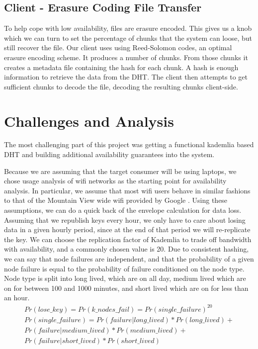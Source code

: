 \documentclass[a4paper,10pt]{article}
\begin{document}
\subsection{Client - Erasure Coding File Transfer}
To help cope with low availability, files are erasure encoded. This gives us a 
knob which we can turn to set the percentage of chunks that the system can 
loose, but still recover the file. Our client uses using Reed-Solomon codes, an 
optimal erasure encoding scheme. It produces a number of chunks. From those 
chunks it creates a metadata file containing the hash for each chunk. A hash is 
enough information to retrieve the data from the DHT. The client then 
attempts to get sufficient chunks to decode the file, decoding the resulting 
chunks client-side.

\section{Challenges and Analysis}
The most challenging part of this project was getting a functional kademlia 
based DHT and building additional availability guarantees into the system.

Because we are assuming that the target consumer will be using laptops, we 
chose usage analysis of wifi networks as the starting point for availability 
analysis. In particular, we assume that most wifi users behave in similar 
fashions to that of the Mountain View wide wifi provided by Google \cite{wifi}.  
Using these assumptions, we can do a quick back of the envelope calculation for 
data loss. Assuming that we republish keys every hour, we only have to care 
about losing data in a given hourly period, since at the end of that period we 
will re-replicate the key.  We can choose the replication factor of Kademlia to 
trade off bandwidth with availability, and a commonly chosen value is 20.  Due 
to consistent hashing, we can say that node failures are independent, and that 
the probability of a given node failure is equal to the probability of failure 
conditioned on the node type.  Node type is split into long lived, which are on 
all day, medium lived which are on for between 100 and 1000 minutes, and short 
lived which are on for less than an hour.  
\begin{multline}
Pr(lose\_key) = Pr(k\_nodes\_fail) = Pr(single\_failure)^{20}
\\
Pr(single\_failure) =
Pr(failure | long\_lived)*Pr(long\_lived) +
\\
Pr(failure | medium\_lived)*Pr(medium\_lived) +
\\
Pr(failure | short\_lived)*Pr(short\_lived)
\\
\end{multline}
\end{document}
